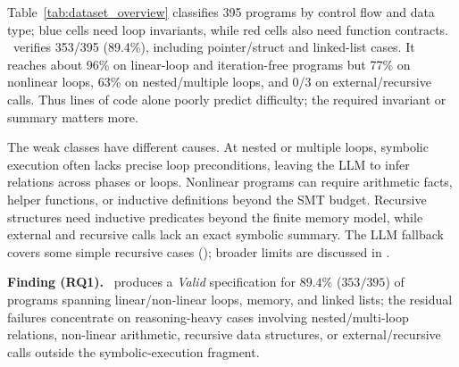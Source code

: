 Table~\ref{tab:dataset_overview} classifies 395 programs by control flow and
data type; blue cells need loop invariants, while red cells also need function
contracts. \toolname\ verifies 353/395 (89.4\%), including pointer/struct and
linked-list cases. It reaches about 96\% on linear-loop and iteration-free
programs but 77\% on nonlinear loops, 63\% on nested/multiple loops, and
0/3 on external/recursive calls. Thus lines of code alone poorly predict
difficulty; the required invariant or summary matters more.

The weak classes have different causes. At nested or multiple loops,
symbolic execution often lacks precise loop preconditions, leaving the LLM
to infer relations across phases or loops. Nonlinear programs can require
arithmetic facts, helper functions, or inductive definitions beyond the SMT
budget. Recursive structures need inductive predicates beyond the finite
memory model, while external and recursive calls lack an exact symbolic
summary. The LLM fallback covers some simple recursive cases
(); broader limits are discussed in
{}.

\begin{finding}
\textbf{Finding (RQ1).} \toolname\ produces a \emph{Valid} specification for $89.4\%$ ($353/395$) of programs spanning linear/non-linear loops, memory, and linked lists; the residual failures concentrate on reasoning-heavy cases involving nested/multi-loop relations, non-linear arithmetic, recursive data structures, or external/recursive calls outside the symbolic-execution fragment.
\end{finding}
